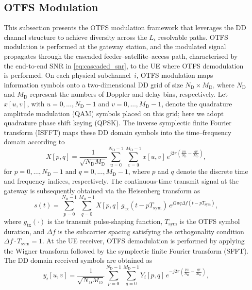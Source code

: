 \documentclass[journal]{IEEEtran}
\begin{document}
\subsection{OTFS Modulation}
\label{sec:otfs}
This subsection presents the OTFS modulation framework that leverages the DD channel structure to achieve diversity across the $L_i$ resolvable paths.  OTFS modulation is performed at the gateway station, and the modulated signal propagates through the cascaded feeder--satellite--access path, characterised by the end-to-end SNR in \eqref{eq:cascaded_snr}, to the UE where OTFS demodulation is performed. On each physical subchannel~$i$, OTFS modulation maps information symbols onto a two-dimensional DD grid of size $N_{\mathrm{D}} \times M_{\mathrm{D}}$, where $N_{\mathrm{D}}$ and $M_{\mathrm{D}}$ represent the numbers of Doppler and delay bins, respectively. Let $x[u,v]$, with $u = 0,\ldots,N_{\mathrm{D}}-1$ and $v = 0,\ldots,M_{\mathrm{D}}-1$, denote the quadrature amplitude modulation (QAM) symbols placed on this grid; here we adopt quadrature phase shift keying (QPSK).  The inverse symplectic finite Fourier transform (ISFFT) maps these DD domain symbols into the time--frequency domain according to
\begin{equation}
X[p,q] = \frac{1}{\sqrt{N_{\mathrm{D}}M_{\mathrm{D}}}} \sum_{u=0}^{N_{\mathrm{D}}-1} \sum_{v=0}^{M_{\mathrm{D}}-1} x[u,v]\, e^{j2\pi\left(\frac{pu}{N_{\mathrm{D}}} - \frac{qv}{M_{\mathrm{D}}}\right)},
\label{eq:isfft}
\end{equation}
for $p = 0,\ldots,N_{\mathrm{D}}-1$ and $q = 0,\ldots,M_{\mathrm{D}}-1$, where $p$ and $q$ denote the discrete time and frequency indices, respectively. The continuous-time transmit signal at the gateway is subsequently obtained via the Heisenberg transform as
\begin{equation}
s(t) = \sum_{p=0}^{N_{\mathrm{D}}-1} \sum_{q=0}^{M_{\mathrm{D}}-1} X[p,q]\,g_{\mathrm{tx}}(t-pT_{\mathrm{sym}})\, e^{j2\pi q \Delta f (t-pT_{\mathrm{sym}})},
\label{eq:tx_signal}
\end{equation}
where $g_{\mathrm{tx}}(\cdot)$ is the transmit pulse-shaping function, $T_{\mathrm{sym}}$ is the OTFS symbol duration, and $\Delta f$ is the subcarrier spacing satisfying the orthogonality condition $\Delta f \cdot T_{\mathrm{sym}} = 1$. At the UE receiver, OTFS demodulation is performed by applying the Wigner transform followed by the symplectic finite Fourier transform (SFFT). The DD domain received symbols are obtained as
\begin{equation}
y_{i}[u,v] = \frac{1}{\sqrt{N_{\mathrm{D}}M_{\mathrm{D}}}} \sum_{p=0}^{N_{\mathrm{D}}-1} \sum_{q=0}^{M_{\mathrm{D}}-1} Y_{i}[p,q]\, e^{-j2\pi\left(\frac{pu}{N_{\mathrm{D}}} - \frac{qv}{M_{\mathrm{D}}}\right)},
\label{eq:sfft}
\end{equation}
\end{document}
